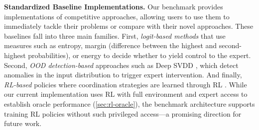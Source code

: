 \textbf{Standardized Baseline Implementations.}  
Our benchmark provides implementations of competitive approaches, allowing users to use them to immediately tackle their \ourMethod problems or compare with their novel approaches. These baselines fall into three main families. First, \textit{logit-based methods} that use measures such as entropy, margin (difference between the highest and second-highest probabilities), or energy to decide whether to yield control to the expert. Second, \textit{OOD detection-based} approaches such as Deep SVDD \citep{pmlr-v80-ruff18a}, which detect anomalies in the input distribution to trigger expert intervention. And finally, \textit{RL-based} policies where coordination strategies are learned through RL \citep{sutton2018reinforcement, schulman2017proximal}. While our current implementation uses RL with full environment and expert access to establish oracle performance (\autoref{sec:rl-oracle}), the benchmark architecture supports training RL policies without such privileged access---a promising direction for future work.



% 

% 


